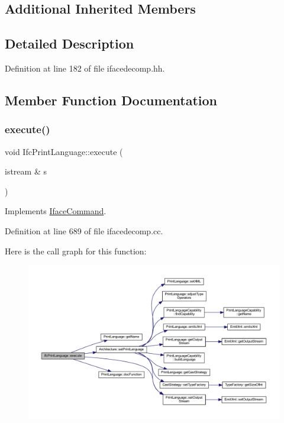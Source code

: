 \subsection*{Additional Inherited Members}


\subsection{Detailed Description}


Definition at line 182 of file ifacedecomp.\+hh.



\subsection{Member Function Documentation}
\mbox{\label{class_ifc_print_language_a2c1930cfbe6eedec2f55080358e4c9a7}} 
\subsubsection{\texorpdfstring{execute()}{execute()}}
{\footnotesize\ttfamily void Ifc\+Print\+Language\+::execute (\begin{DoxyParamCaption}\item[{istream \&}]{s }\end{DoxyParamCaption})\hspace{0.3cm}{\ttfamily [virtual]}}



Implements \mbox{\hyperlink{class_iface_command_af10e29cee2c8e419de6efe9e680ad201}{Iface\+Command}}.



Definition at line 689 of file ifacedecomp.\+cc.

Here is the call graph for this function\+:
\nopagebreak
\begin{figure}[H]
\begin{center}
\leavevmode
\includegraphics[width=350pt]{class_ifc_print_language_a2c1930cfbe6eedec2f55080358e4c9a7_cgraph}
\end{center}
\end{figure}


